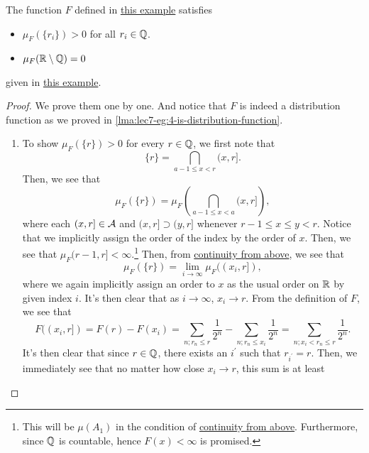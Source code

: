 \begin{lemma}\label{lma:lec8-eg:3}
	The function \(F\) defined in \hyperref[eg:lec8-3]{this example} satisfies
	\begin{itemize}
		\item \(\mu _F(\{r_{i}\})>0\) for all \(r_{i}\in\mathbb{\MakeUppercase{q}} \).
		\item \(\mu _F(\mathbb{\MakeUppercase{r}} \setminus \mathbb{\MakeUppercase{q}} ) = 0\)
	\end{itemize}
	given in \hyperref[eg:lec8-3]{this example}.
\end{lemma}
\begin{proof}
	We prove them one by one. And notice that \(F\) is indeed a distribution function as we proved in \autoref{lma:lec7-eg:4-is-distribution-function}.
	\begin{enumerate}[(1)]
		\item To show \(\mu _{F}(\{r\}) > 0\) for every \(r\in \mathbb{\MakeUppercase{q}} \), we first note that
		      \[
			      \{r\} = \bigcap\limits_{a-1\leq x< r}(x, r].
		      \]
		      Then, we see that
		      \[
			      \mu _{F}(\{r\}) = \mu _{F}\left(\bigcap\limits_{a-1\leq x<a} (x, r]\right),
		      \]
		      where each \((x, r]\in\mathcal{\MakeUppercase{a}} \) and \((x, r]\supset (y, r]\) whenever \(r-1\leq x \leq y<r\). Notice that we implicitly
		      assign the order of the index by the order of \(x\). Then, we see that \(\mu _{F}(r-1, r]<\infty \).\footnote{This will be \(\mu (A_1)\) in the condition of \hyperref[thm:measure-space-continuity-from-above]{continuity from above}. Furthermore, since \(\mathbb{\MakeUppercase{q}} \) is countable, hence \(F(x)<\infty \) is promised.}
		      Then, from \hyperref[thm:measure-space-continuity-from-above]{continuity from above}, we see that
		      \[
			      \mu _{F}(\{r\}) = \lim\limits_{i \to \infty} \mu _{F}((x_{i}, r]),
		      \]
		      where we again implicitly assign an order to \(x\) as the usual order on \(\mathbb{\MakeUppercase{r}}\) by given index \(i\). It's then clear
		      that as \(i\to \infty \), \(x_{i}\to r\). From the definition of \(F\), we see that
		      \[
			      F((x_{i}, r]) = F(r) - F(x_{i}) = \sum\limits_{n;r_{n}\leq r} \frac{1}{2^n} - \sum\limits_{n;r_{n}\leq x_{i}} \frac{1}{2^n} = \sum\limits_{n;x_{i}<r_{n}\leq r}\frac{1}{2^n}.
		      \]
		      It's then clear that since \(r\in \mathbb{\MakeUppercase{q}} \), there exists an \(i ^\prime \) such that \(r_{i ^\prime } = r\). Then, we immediately see
		      that no matter how close \(x_{i}\to r\), this sum is at least

\end{enumerate}
\end{proof}

